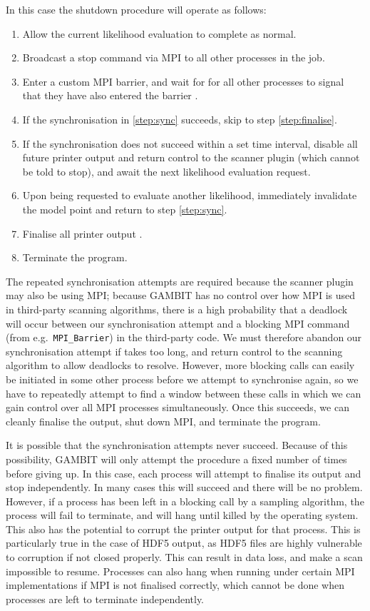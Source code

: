\documentclass[pdftex,twocolumn,epjc3_preprint,runningheads]{svjour3}
\renewcommand{\_}{\discretionary{\underscore}{}{\underscore}}
\newcommand\cpp[1]{{\lstinline!#1!}}  %
\newcommand{\gambit}{\textsf{GAMBIT}\xspace}
\newcommand{\GB}{\gambit}
\newcommand{\mpi}{\textsf{MPI}\xspace}
\begin{document}
In this case the shutdown procedure will operate as follows:
\begin{enumerate}
\item Allow the current likelihood evaluation to complete as normal.
\item Broadcast a stop command via \mpi to all other processes in the job.
\item Enter a custom \mpi barrier, and wait for for all other processes to signal that they have also entered the barrier \label{step:sync}.
\item If the synchronisation in \ref{step:sync} succeeds, skip to step \ref{step:finalise}.
\item If the synchronisation does not succeed within a set time interval, disable all future printer output and return control to the scanner plugin (which cannot be told to stop), and await the next likelihood evaluation request.
\item Upon being requested to evaluate another likelihood, immediately invalidate the model point and return to step \ref{step:sync}.
\item Finalise all printer output \label{step:finalise}.
\item Terminate the program.
\end{enumerate}
%
The repeated synchronisation attempts are required because the scanner plugin may also be using \mpi; because \GB has no control over how \mpi is used in third-party scanning algorithms, there is a high probability that a deadlock will occur between our synchronisation attempt and a blocking \mpi command (from e.g.\ \cpp{MPI_Barrier}) in the third-party code. We must therefore abandon our synchronisation attempt if takes too long, and return control to the scanning algorithm to allow deadlocks to resolve. However, more blocking calls can easily be initiated in some other process before we attempt to synchronise again, so we have to repeatedly attempt to find a window between these calls in which we can gain control over all \mpi processes simultaneously. Once this succeeds, we can cleanly finalise the output, shut down \mpi, and terminate the program.

It is possible that the synchronisation attempts never succeed. Because of this possibility, \GB will only attempt the procedure a fixed number of times before giving up. In this case, each process will attempt to finalise its output and stop independently. In many cases this will succeed and there will be no problem.  However, if a process has been left in a blocking call by a sampling algorithm, the process will fail to terminate, and will hang until killed by the operating system. This also has the potential to corrupt the printer output for that process.  This is particularly true in the case of \textsf{HDF5} output, as \textsf{HDF5} files are highly vulnerable to corruption if not closed properly.  This can result in data loss, and make a scan impossible to resume. Processes can also hang when running under certain \mpi implementations if \mpi is not finalised correctly, which cannot be done when processes are left to terminate independently.
\end{document}
